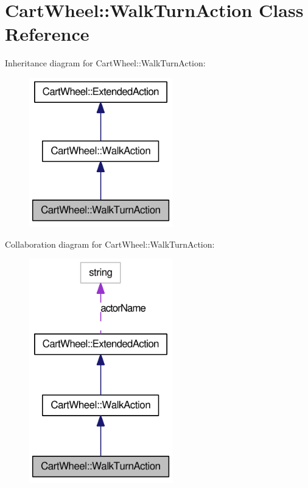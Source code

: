 \hypertarget{classCartWheel_1_1WalkTurnAction}{
\section{CartWheel::WalkTurnAction Class Reference}
\label{classCartWheel_1_1WalkTurnAction}
}


Inheritance diagram for CartWheel::WalkTurnAction:\nopagebreak
\begin{figure}[H]
\begin{center}
\leavevmode
\includegraphics[width=176pt]{classCartWheel_1_1WalkTurnAction__inherit__graph}
\end{center}
\end{figure}


Collaboration diagram for CartWheel::WalkTurnAction:\nopagebreak
\begin{figure}[H]
\begin{center}
\leavevmode
\includegraphics[width=176pt]{classCartWheel_1_1WalkTurnAction__coll__graph}
\end{center}
\end{figure}
